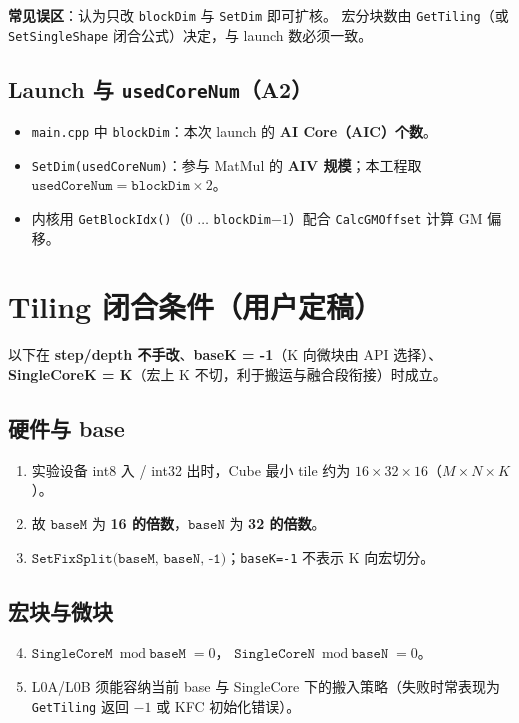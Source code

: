 \documentclass[UTF8,a4paper,11pt]{ctexart}
\begin{document}
\textbf{常见误区}：认为只改 \texttt{blockDim} 与 \texttt{SetDim} 即可扩核。
宏分块数由 \texttt{GetTiling}（或 \texttt{SetSingleShape} 闭合公式）决定，与 launch 数必须一致。

\subsection{Launch 与 \texttt{usedCoreNum}（A2）}
\begin{itemize}
  \item \texttt{main.cpp} 中 \texttt{blockDim}：本次 launch 的 \textbf{AI Core（AIC）个数}。
  \item \texttt{SetDim(usedCoreNum)}：参与 MatMul 的 \textbf{AIV 规模}；本工程取
        $\texttt{usedCoreNum} = \texttt{blockDim} \times 2$。
  \item 内核用 \texttt{GetBlockIdx()}（0 $\ldots$ \texttt{blockDim}$-1$）配合
        \texttt{CalcGMOffset} 计算 GM 偏移。
\end{itemize}

\section{Tiling 闭合条件（用户定稿）}

以下在 \textbf{step/depth 不手改}、\textbf{baseK = -1}（K 向微块由 API 选择）、
\textbf{SingleCoreK = K}（宏上 K 不切，利于搬运与融合段衔接）时成立。

\subsection{硬件与 base}
\begin{enumerate}
  \item 实验设备 int8 入 / int32 出时，Cube 最小 tile 约为
        $16 \times 32 \times 16$（$M\times N\times K$）。
  \item 故 $\texttt{baseM}$ 为 \textbf{16 的倍数}，$\texttt{baseN}$ 为 \textbf{32 的倍数}。
  \item $\texttt{SetFixSplit(baseM, baseN, -1)}$；\texttt{baseK=-1} 不表示 K 向宏切分。
\end{enumerate}

\subsection{宏块与微块}
\begin{enumerate}
  \setcounter{enumi}{3}
  \item $\texttt{SingleCoreM} \bmod \texttt{baseM} = 0$，
        $\texttt{SingleCoreN} \bmod \texttt{baseN} = 0$。
  \item L0A/L0B 须能容纳当前 base 与 SingleCore 下的搬入策略（失败时常表现为
        \texttt{GetTiling} 返回 $-1$ 或 KFC 初始化错误）。
\end{enumerate}
\end{document}
